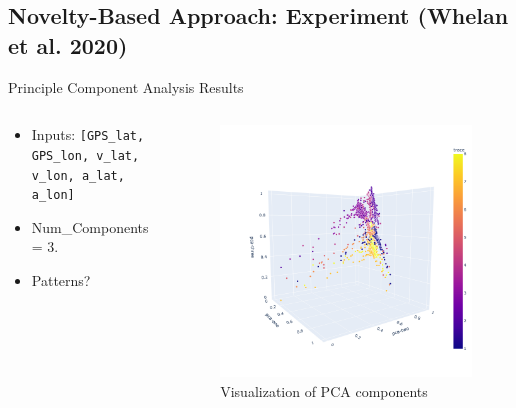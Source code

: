 \documentclass[aspectratio=169, 8pt]{beamer}
\begin{document}
\subsection{Novelty-Based Approach: Experiment (Whelan et al. 2020)}

\begin{frame}{Principle Component Analysis Results}

\begin{columns}

\begin{column}{0.3 \linewidth}
    \begin{itemize}
        \item Inputs: \texttt{[GPS\_lat, GPS\_lon, v\_lat, v\_lon, a\_lat, a\_lon]}
        \item Num\_Components = 3.
        \item Patterns?
    \end{itemize}
\end{column}


\begin{column}{0.7 \linewidth}
    \begin{figure}
        \centering
        \includegraphics[width = 0.6\linewidth]{images/newplot.png}
        \caption{Visualization of PCA components}
        \label{fig:enter-label}
    \end{figure}
\end{column}

\end{columns}



\end{frame}
\end{document}
